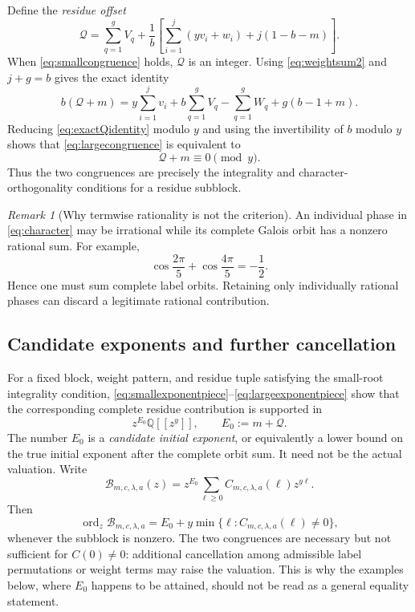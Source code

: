 \documentclass[11pt]{amsart}
\theoremstyle{remark}
\newtheorem{remark}[theorem]{Remark}
\newcommand{\Q}{\mathbb{Q}}
\newcommand{\ord}{\operatorname{ord}}
\begin{document}
Define the \emph{residue offset}
\begin{equation}\label{eq:Qdef}
 \mathcal Q=
 \sum_{q=1}^{g}V_q
 +\frac1b\left[
   \sum_{i=1}^{j}(yv_i+w_i)+j(1-b-m)
 \right].
\end{equation}
When \eqref{eq:smallcongruence} holds, $\mathcal Q$ is an integer.  Using \eqref{eq:weightsum2} and $j+g=b$ gives the exact identity
\begin{equation}\label{eq:exactQidentity}
 b(\mathcal Q+m)
 =y\sum_{i=1}^{j}v_i
  +b\sum_{q=1}^{g}V_q
  -\sum_{q=1}^{g}W_q
  +g(b-1+m).
\end{equation}
Reducing \eqref{eq:exactQidentity} modulo $y$ and using the invertibility of $b$ modulo $y$ shows that \eqref{eq:largecongruence} is equivalent to
\begin{equation}\label{eq:Qcongruence}
    \mathcal Q+m\equiv0\pmod y.
\end{equation}
Thus the two congruences are precisely the integrality and character-orthogonality conditions for a residue subblock.

\begin{remark}[Why termwise rationality is not the criterion]\label{rem:rationality}
An individual phase in \eqref{eq:character} may be irrational while its complete Galois orbit has a nonzero rational sum.  For example,
\[
    \cos\frac{2\pi}{5}+\cos\frac{4\pi}{5}=-\frac12.
\]
Hence one must sum complete label orbits.  Retaining only individually rational phases can discard a legitimate rational contribution.
\end{remark}

\subsection{Candidate exponents and further cancellation}\label{subsec:candidate}

For a fixed block, weight pattern, and residue tuple satisfying the small-root integrality condition, \eqref{eq:smallexponentpiece}--\eqref{eq:largeexponentpiece} show that the corresponding complete residue contribution is supported in
\begin{equation}\label{eq:candidatesupport}
    z^{E_0}\Q[[z^y]],
    \qquad
    E_0:=m+\mathcal Q.
\end{equation}
The number $E_0$ is a \emph{candidate initial exponent}, or equivalently a lower bound on the true initial exponent after the complete orbit sum.  It need not be the actual valuation.  Write
\begin{equation}\label{eq:residueseries}
    \mathcal B_{m,c,\lambda,a}(z)
    =z^{E_0}\sum_{\ell\ge0}C_{m,c,\lambda,a}(\ell)z^{y\ell}.
\end{equation}
Then
\begin{equation}\label{eq:truevaluation}
    \ord_z\mathcal B_{m,c,\lambda,a}
    =E_0+y\min\{\ell:C_{m,c,\lambda,a}(\ell)\neq0\},
\end{equation}
whenever the subblock is nonzero.  The two congruences are necessary but not sufficient for $C(0)\neq0$: additional cancellation among admissible label permutations or weight terms may raise the valuation.  This is why the examples below, where $E_0$ happens to be attained, should not be read as a general equality statement.
\end{document}
